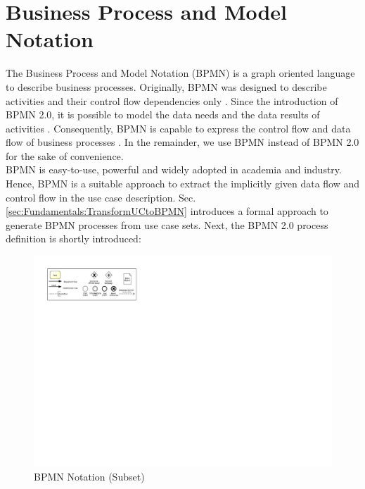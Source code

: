 \section{Business Process and Model Notation}
\label{sec:Fundamentals:BPMN}
The Business Process and Model Notation (BPMN) is a graph oriented language to describe business processes. Originally, BPMN was designed to describe activities and their control flow dependencies only \cite{VisualizeBPMN}. Since the introduction of BPMN 2.0, it is possible to model the data needs and the data results of activities \cite{OMG}. Consequently, BPMN is capable to express the control flow and data flow of business processes \cite{DataFlowErrorBPMN}. In the remainder, we use BPMN instead of BPMN 2.0 for the sake of convenience. \\
BPMN is easy-to-use, powerful and widely adopted in academia and industry. Hence, BPMN is a suitable approach to extract the implicitly given data flow and control flow in the use case description. Sec. \ref{sec:Fundamentals:TransformUCtoBPMN} introduces a formal approach to generate BPMN processes from use case sets. Next, the BPMN 2.0 process definition is shortly introduced:


\begin{figure}[h!]
	\includegraphics[width=\textwidth, trim={1cm 16.5cm 19.2cm 1cm}]{img/Overview.pdf}
	\caption{BPMN Notation (Subset)}
	\label{fig:BPMNSubset}
\end{figure}

